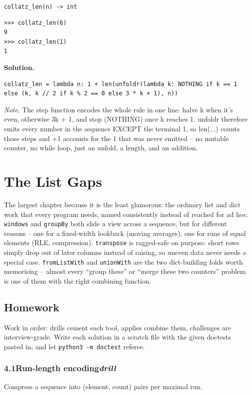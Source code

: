 \documentclass[10pt,letterpaper]{book}
\begin{document}
\noindent\texttt{collatz\_len(n) -> int}
\begin{lstlisting}[style=ex]
>>> collatz_len(6)
9
>>> collatz_len(1)
1
\end{lstlisting}
\noindent\textbf{Solution.}
\begin{lstlisting}[style=code]
collatz_len = lambda n: 1 + len(unfoldr(lambda k: NOTHING if k == 1 else (k, k // 2 if k % 2 == 0 else 3 * k + 1), n))
\end{lstlisting}
\noindent\textit{Note.} The step function encodes the whole rule in one line: halve k when it's even, otherwise 3k + 1, and stop (NOTHING) once k reaches 1. unfoldr therefore emits every number in the sequence EXCEPT the terminal 1, so len(...) counts those steps and +1 accounts for the 1 that was never emitted -- no mutable counter, no while loop, just an unfold, a length, and an addition.

\clearpage
\chapter{The List Gaps}

The largest chapter because it is the least glamorous: the ordinary list
and dict work that every program needs, named consistently instead of
reached for ad hoc. \texttt{windows} and \texttt{groupBy} both slide a view
across a sequence, but for different reasons -- one for a fixed-width
lookback (moving averages), one for runs of equal elements (RLE,
compression). \texttt{transpose} is ragged-safe on purpose: short rows
simply drop out of later columns instead of raising, so uneven data never
needs a special case. \texttt{fromListWith} and \texttt{unionWith} are the
two dict-building folds worth memorising -- almost every ``group these'' or
``merge these two counters'' problem is one of them with the right
combining function.
\section{Homework}
Work in order: drills cement each tool, applies combine them,
challenges are interview-grade. Write each solution in a scratch file with
the given doctests pasted in, and let \texttt{python3 -m doctest} referee.
\subsection*{4.1\quad Run-length encoding\hfill\textnormal{\textit{drill}}}
Compress a sequence into (element, count) pairs per maximal run.
\end{document}
